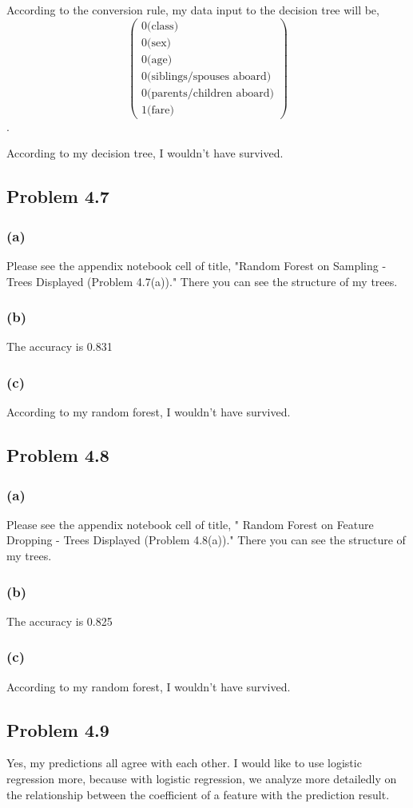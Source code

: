 \documentclass{article}
\begin{document}
	According to the conversion rule, my data input to the decision tree will be,
\begin{equation*}	
	\begin{pmatrix} 0 \text{(class)}\\ 0 \text{(sex)}\\ 0\text{(age)}\\ 0\text{(siblings/spouses aboard)}\\0\text{(parents/children aboard)}\\ 1\text{(fare)}\end{pmatrix} 
	\end{equation*}.
	
	According to my decision tree, I wouldn't have survived.
\subsection*{Problem 4.7}
\subsubsection*{(a)}
	Please see the appendix notebook cell of title, "Random Forest on Sampling - Trees Displayed (Problem 4.7(a))." There you can see the structure of my trees.
\subsubsection*{(b)}
	The accuracy is  0.831
\subsubsection*{(c)}
	According to my random forest, I wouldn't have survived.

\subsection*{Problem 4.8}
\subsubsection*{(a)}
	Please see the appendix notebook cell of title, " Random Forest on Feature Dropping - Trees Displayed (Problem 4.8(a))." There you can see the structure of my trees.
	
\subsubsection*{(b)}
	The accuracy is  0.825
	
\subsubsection*{(c)}
	According to my random forest, I wouldn't have survived.
	
\subsection*{Problem 4.9}
	Yes, my predictions all agree with each other. I would like to use logistic regression more, because with logistic regression, we analyze more detailedly on the relationship between the coefficient of a feature with the prediction result.
	

\end{document}
